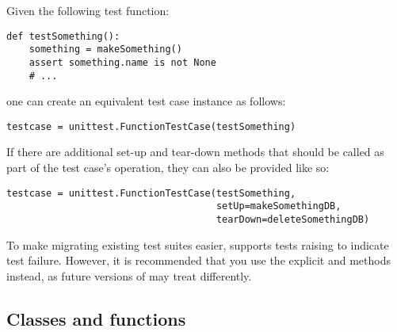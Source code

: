 Given the following test function:

\begin{verbatim}
def testSomething():
    something = makeSomething()
    assert something.name is not None
    # ...
\end{verbatim}

one can create an equivalent test case instance as follows:

\begin{verbatim}
testcase = unittest.FunctionTestCase(testSomething)
\end{verbatim}

If there are additional set-up and tear-down methods that should be
called as part of the test case's operation, they can also be provided
like so:

\begin{verbatim}
testcase = unittest.FunctionTestCase(testSomething,
                                     setUp=makeSomethingDB,
                                     tearDown=deleteSomethingDB)
\end{verbatim}

To make migrating existing test suites easier, 
supports tests raising  to indicate test failure.
However, it is recommended that you use the explicit
 and  methods instead,
as future versions of  may treat 
differently.




\subsection{Classes and functions
            \label{unittest-contents}}

